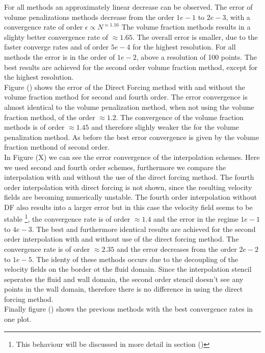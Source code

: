 \newpage

For all methods an approximately linear decrease  can be observed.
The error of volume penalizations methods decrease from the order $1e-1$ to $2e-3$, with
a convergence rate of order  $\epsilon \propto N^{\approx1.16}$
The volume fraction methods results in a slighty better convergence rate of $\approx 1.65$.
The overall error is smaller, due to the faster converge rates and of order $5e-4$ for the
highest resolution. For all methods the error is in the order of $1e-2$, above a resolution of 100 points.
The best results are achieved for the second order volume fraction method, except for the highest resolution.\\
Figure () shows the error of the Direct Forcing method with and without the volume fraction method for second
and fourth order. The error convergence is almost identical to the volume penalization method, when not using the volume
fraction method, of the order $\approx 1.2$. The convergence of the volume fraction methods is of order $\approx 1.45$
and therefore slighly weaker the for the volume penalization method.
As before the best error convergence is given by the volume fraction methond of second order.\\
In Figure (X) we can see the error convergence of the interpolation schemes.
Here we used second and fourth order schemes, furthermore we compare the interpolation with and without the
use of the direct forcing method.
The fourth order interpolation with direct forcing is not shown, since the resulting velocity fields are becoming
numerically unstable. The fourth order interpolation without DF also results into a larger error but in this case
the velocity field seems to be stable \footnote{This behaviour will be discussed in more detail in section ()}, the
convergence rate is of order $\approx 1.4$ and the error in the regime $1e-1$ to $4e-3$.
The best and furthermore identical results are achieved for the second order interpolation with and without
use of the direct forcing method. The convergence rate is of order $\approx 2.35$ and the error
decreases from the order $2e-2$ to $1e-5$. The identy of these methods occurs due to the decoupling of the velocity fields
on the border ot the fluid domain. Since the interpolation stencil seperates the fluid and wall domain, the second order
stencil doesn't see any points in the wall domain, therefore there is no difference in using the direct forcing method.\\
Finally figure () shows the previous methods with the best convergence rates in one plot.

